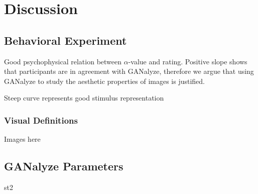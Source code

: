 \documentclass[../main.tex]{subfiles}
\begin{document}
\section{Discussion}

	\subsection{Behavioral Experiment}
	Good psychophysical relation between $\alpha$-value and rating. Positive slope shows that participants are in agreement with GANalyze, therefore we argue that using GANalyze to study the aesthetic properties of images is justified.
	
	Steep curve represents good stimulus representation


	\subsubsection{Visual Definitions}
	Images here
	
	\subsection{GANalyze Parameters}
	st2
\end{document}

